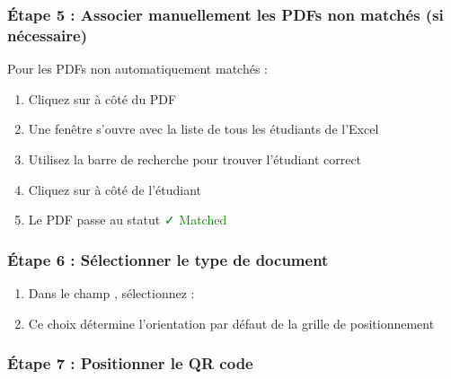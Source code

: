 \subsubsection{Étape 5 : Associer manuellement les PDFs non matchés (si nécessaire)}

Pour les PDFs non automatiquement matchés :

\begin{enumerate}[leftmargin=*]
    \item Cliquez sur  à côté du PDF
    \item Une fenêtre s'ouvre avec la liste de tous les étudiants de l'Excel
    \item Utilisez la barre de recherche pour trouver l'étudiant correct
    \item Cliquez sur  à côté de l'étudiant
    \item Le PDF passe au statut \textcolor{green}{✓ Matched}
\end{enumerate}

\subsubsection{Étape 6 : Sélectionner le type de document}

\begin{enumerate}[leftmargin=*]
    \item Dans le champ , sélectionnez :
    \item Ce choix détermine l'orientation par défaut de la grille de positionnement
\end{enumerate}

\subsubsection{Étape 7 : Positionner le QR code}

